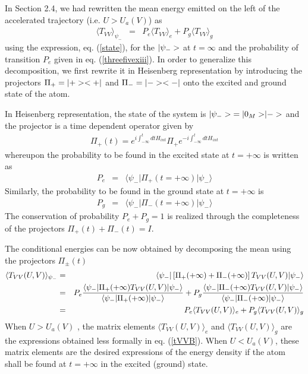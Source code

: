 In Section 2.4, we had rewritten the mean energy
emitted on the left of the accelerated trajectory (i.e. $U>U_a(V)$)
as
\begin{eqnarray} \langle T_{VV}
\rangle_{\psi_-} &=&
P_e \langle T_{VV}
\rangle_e + P_g \langle T_{VV} \rangle_g
\label{ooo}
\end{eqnarray}
using the expression, eq. (\ref{state}),
 for the $\mbox{$ \vert \psi_- > $}$ at $t=\infty$ and the probability of
transition $P_e$ given in eq. (\ref{threefivexiii}).
In order to generalize this
decomposition, we first rewrite it in Heisenberg
representation by introducing the projectors $\Pi_+ =
\mbox{$ \vert + > $}\mbox{$ < + \vert $}$ and  $\Pi_- = \mbox{$ \vert - > $}\mbox{$ < - \vert $}$ onto the
excited and ground state of the atom.

In Heisenberg representation, the state of the system is
$\mbox{$ \vert \psi_- > $}=\mbox{$ \vert 0_M > $} \mbox{$ \vert - > $}$ and the projector is a time dependent operator
given by
\begin{eqnarray}
\Pi_+(t) = e^{i\int^t_{-\infty} dt H_{int}} \Pi_+ e^{-i\int^t_{-\infty} dt
H_{int}}
\label{Pidet}
\end{eqnarray}
whereupon the probability to be found in the
excited
state at $t=+\infty$ is written as
\begin{eqnarray}
P_e
&=&\langle \psi_- \vert
\Pi_+(t=+\infty)   \vert \psi_-\rangle \label{ootwo}
\end{eqnarray}
Similarly, the probability to
be found in the ground state at $t=+ \infty$ is
\begin{eqnarray} P_g &=& \langle
\psi_- \vert  \Pi_-(t=+\infty)   \vert \psi_-\rangle
\label{oothree} \end{eqnarray} The conservation of
probability $P_e+P_g=1$ is realized through the
completeness of the projectors $\Pi_+(t)+ \Pi_-(t) = I$.

The conditional energies can be now obtained by decomposing
the mean using the projectors $\Pi_\pm(t)$
\begin{eqnarray}
\langle T_{VV}(U,V) \rangle_{\psi_-}
 &=& \langle \psi_- \vert \left[ \Pi_+ (+\infty) + \Pi_- (+\infty)\right]
T_{VV}(U,V)
\vert \psi_-\rangle\nonumber\\ &=& P_e { \langle \psi_-
\vert \Pi_+ (+\infty) T_{VV}(U,V) \vert \psi_-\rangle \over \langle
\psi_- \vert \Pi_+ (+\infty) \vert \psi_-\rangle } +
P_g { \langle \psi_- \vert \Pi_- (+\infty) T_{VV}(U,V) \vert
\psi_-\rangle \over \langle \psi_- \vert \Pi_- (+\infty) \vert
\psi_-\rangle }\nonumber\\ &=&  P_e \langle
T_{VV}(U,V)\rangle_e + P_g \langle  T_{VV}(U,V)\rangle_g
\label{oofour}
\end{eqnarray}
When $U>U_a(V)$ , the matrix
elements  $\langle  T_{VV}(U,V)\rangle_e$ and $\langle
T_{VV}(U,V)\rangle_g$ are the expressions obtained less
formally in eq. (\ref{tVVB}).
When
$U<U_a(V)$, these matrix elements are the desired
expressions of the energy density if the atom shall be
found at $t=+\infty$ in the excited (ground) state.

